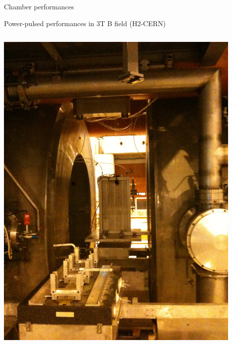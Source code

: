 \documentclass[10pt]{beamer}
\begin{document}
\begin{frame}{Chamber performances  }
\begin{block}{Power-pulsed performances in 3T B field (H2-CERN)}
 \begin{columns}

      \begin{column}{0.5\textwidth}
        \centerline{\includegraphics[width=0.9\textwidth]{jpg/PowerPulsingPhoto}}
      \end{column}
     

\end{columns}
\end{block}
\end{frame}
\end{document}

